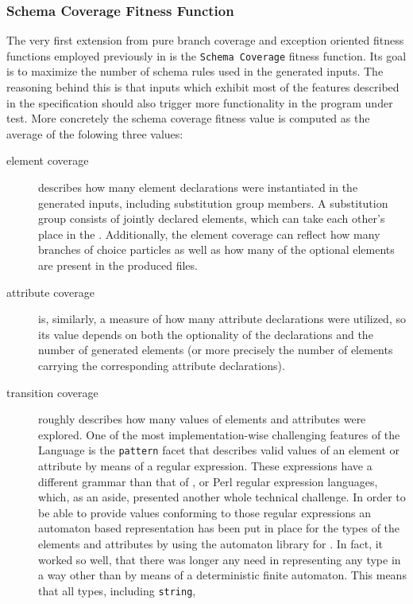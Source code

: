 \subsubsection{Schema Coverage Fitness Function}
\label{sec:fit:schema}
The very first extension from pure \java branch coverage and exception oriented fitness functions employed 
previously in \xmlmate is the \texttt{Schema Coverage} fitness function. Its goal is to maximize the number 
of schema rules used in the generated inputs. The reasoning behind this is that inputs which exhibit most of 
the features described in the specification should also trigger more functionality in the program under test. 
More concretely the schema coverage fitness value is computed as the average of the folowing three values:
\begin{description}
  \item[element coverage] describes how many element declarations were instantiated in the generated inputs, 
  including substitution group members. A substitution group consists of jointly declared elements, which 
  can take each other's place in the \xml. Additionally, the element coverage can reflect how many branches 
  of choice particles as well as how many of the optional elements are present in the produced files.
  \item[attribute coverage] is, similarly, a measure of how many attribute declarations were utilized, so its 
  value depends on both the optionality of the declarations and the number of generated elements (or more 
  precisely the number of elements carrying the corresponding attribute declarations).
  \item[transition coverage] roughly describes how many values of elements and attributes were explored. One of
  the most implementation-wise challenging features of the \xsd{} Language is the \texttt{pattern}
  facet that describes valid values of an element or attribute by means of a regular expression. These
  expressions have a different grammar than that of \java, \python or Perl regular expression
  languages, which, as an aside, presented another whole technical challenge.
  In order to be able to provide values conforming to those regular expressions an automaton based representation 
  has been put in place for the types of the elements and attributes by using the automaton
  library\cite{automaton} for \java.
  In fact, it worked so well, that there was longer any need in representing any type in a way other than by
  means of a deterministic finite automaton. This means that all types, including \texttt{string},

\end{description}
